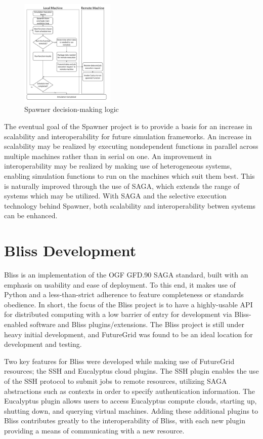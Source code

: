 \documentclass[]{paper}
\begin{document}
\begin{figure}[t]
	\centering
		\includegraphics[width=0.40\textwidth]{figures/spawner-logic.pdf}
\caption{Spawner decision-making logic}
\label{fig:spawner}
\end{figure}		

The eventual goal of the Spawner project is to provide a basis for an increase in
scalability and interoperability for future simulation frameworks.  An increase in scalability
may be realized by executing nondependent functions in parallel across multiple machines rather
than in serial on one.  An improvement in interoperability may be realized by making use of heterogeneous systems,
enabling simulation functions to run on the machines which suit them best.  This is naturally improved through
the use of SAGA, which extends the range of systems which may be utilized.  With SAGA and the
selective execution technology behind Spawner, both scalability and interoperability betwen systems
can be enhanced.

\section{Bliss Development}
Bliss is an implementation of the OGF GFD.90 SAGA standard, built with an emphasis
on usability and ease of deployment.  To this end, it makes use of Python and a
less-than-strict adherence to feature completeness or standards obedience.
In short, the focus of the Bliss project is to have a highly-usable API for distributed
computing with a low barrier of entry for development via Bliss-enabled software
and Bliss plugins/extensions.  The Bliss project is still under heavy 
initial development, and FutureGrid was found to be an ideal location for development and testing.

Two key features for Bliss were developed while making use of FutureGrid resources; 
the SSH and Eucalyptus cloud plugins.  The SSH plugin enables the use of the SSH protocol
to submit jobs to remote resources, utilizing SAGA abstractions such as contexts in order
to specify authentication information.  The Eucalyptus plugin allows users to access
Eucalyptus compute clouds, starting up, shutting down, and querying virtual machines.
Adding these additional plugins to Bliss contributes greatly to the interoperability of
Bliss, with each new plugin providing a means of communicating with a new resource.
\end{document}
